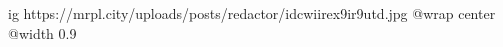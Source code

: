  
 
 
 
 

\ifcmt
  ig https://mrpl.city/uploads/posts/redactor/idcwiirex9ir9utd.jpg
  @wrap center
  @width 0.9
\fi
